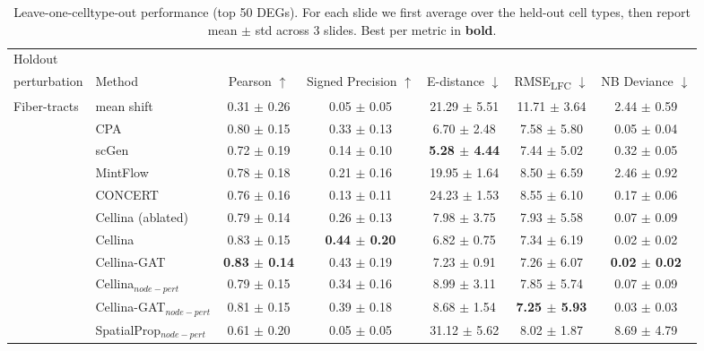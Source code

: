 \begin{table}[t]
\centering
\caption{Leave-one-celltype-out performance (top 50 DEGs). For each slide we first average over the held-out cell types, then report mean $\pm$ std across 3 slides. Best per metric in \textbf{bold}.}
\label{tab:loo_summary_merfish}
\begin{tabular}{llccccc}
\toprule
Holdout \\ perturbation & Method & Pearson $\uparrow$ & Signed Precision $\uparrow$ & E-distance $\downarrow$ & RMSE\textsubscript{LFC} $\downarrow$ & NB Deviance $\downarrow$ \\
\toprule

\multirow[c]{11}{*}{Fiber-tracts} & mean shift & 0.31 $\pm$ 0.26 & 0.05 $\pm$ 0.05 & 21.29 $\pm$ 5.51 & 11.71 $\pm$ 3.64 & 2.44 $\pm$ 0.59 \\
 & CPA & 0.80 $\pm$ 0.15 & 0.33 $\pm$ 0.13 & 6.70 $\pm$ 2.48 & 7.58 $\pm$ 5.80 & 0.05 $\pm$ 0.04 \\
 & scGen & 0.72 $\pm$ 0.19 & 0.14 $\pm$ 0.10 & \textbf{5.28 $\pm$ 4.44} & 7.44 $\pm$ 5.02 & 0.32 $\pm$ 0.05 \\
 & MintFlow & 0.78 $\pm$ 0.18 & 0.21 $\pm$ 0.16 & 19.95 $\pm$ 1.64 & 8.50 $\pm$ 6.59 & 2.46 $\pm$ 0.92 \\
 & CONCERT & 0.76 $\pm$ 0.16 & 0.13 $\pm$ 0.11 & 24.23 $\pm$ 1.53 & 8.55 $\pm$ 6.10 & 0.17 $\pm$ 0.06 \\
 & Cellina (ablated) & 0.79 $\pm$ 0.14 & 0.26 $\pm$ 0.13 & 7.98 $\pm$ 3.75 & 7.93 $\pm$ 5.58 & 0.07 $\pm$ 0.09 \\
 & Cellina & 0.83 $\pm$ 0.15 & \textbf{0.44 $\pm$ 0.20} & 6.82 $\pm$ 0.75 & 7.34 $\pm$ 6.19 & 0.02 $\pm$ 0.02 \\
 & Cellina-GAT & \textbf{0.83 $\pm$ 0.14} & 0.43 $\pm$ 0.19 & 7.23 $\pm$ 0.91 & 7.26 $\pm$ 6.07 & \textbf{0.02 $\pm$ 0.02} \\
 & Cellina$_{node-pert}$ & 0.79 $\pm$ 0.15 & 0.34 $\pm$ 0.16 & 8.99 $\pm$ 3.11 & 7.85 $\pm$ 5.74 & 0.07 $\pm$ 0.09 \\
 & Cellina-GAT$_{node-pert}$ & 0.81 $\pm$ 0.15 & 0.39 $\pm$ 0.18 & 8.68 $\pm$ 1.54 & \textbf{7.25 $\pm$ 5.93} & 0.03 $\pm$ 0.03 \\
 & SpatialProp$_{node-pert}$ & 0.61 $\pm$ 0.20 & 0.05 $\pm$ 0.05 & 31.12 $\pm$ 5.62 & 8.02 $\pm$ 1.87 & 8.69 $\pm$ 4.79 \\
\midrule


\end{tabular}
\end{table}
